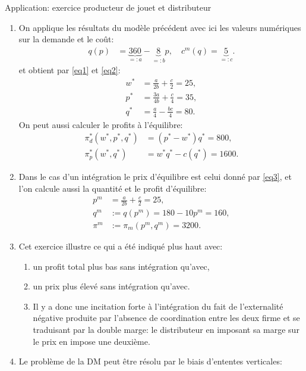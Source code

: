 \begin{frame}[allowframebreaks]{Application: exercice producteur de jouet et distributeur}
\begin{enumerate}
\item On applique les résultats du modèle précédent avec ici les valeurs numériques 
sur la demande et le coût:
\begin{align*}
    q(p) &= \underbrace{360}_{=:a} - \underbrace{8}_{=:b}p, \quad c^m(q) = \underbrace{5}_{=:c}.
\end{align*}
et obtient par \eqref{eq1} et \eqref{eq2}:
\begin{align*}
    w^* &= \frac{a}{2b} + \frac{c}{2} = 25,\\
    p^* &=  \frac{3a}{4b} +\frac{c}{4} = 35,\\
    q^* &= \frac{a}{4} - \frac{bc}{4} = 80.
\end{align*}
On peut aussi calculer le profits à l'équilibre: 
\begin{align*}
\pi_d^*(w^*, p^*, q^*) &= (p^* - w^*) q^* = 800,\\
\pi_p^*(w^*, q^*) &= w^*q^* - c(q^*) = 1600.
\end{align*}
\item Dans le cas d'un intégration le prix d'équilibre est celui donné par \eqref{eq3}, et l'on calcule aussi la 
quantité et le profit d'équilibre:
\begin{align*}
p^m &=  \frac{a}{2b} + \frac{c}{2} = 25,\\
q^m &:=q(p^m) = 180 - 10p^m = 160,\\
\pi^m &:= \pi_m(p^m, q^m)= 3200.
\end{align*}
\item Cet exercice illustre ce qui a été indiqué plus haut avec: 
\begin{enumerate}[$\star$]
\item un profit total plus bas sans intégration qu'avec,
\item un prix plus élevé sans intégration qu'avec.
\item Il y a donc une incitation forte à l'intégration du fait de l'externalité 
négative produite par l'absence de coordination entre les deux firme et se traduisant 
par la double marge: le distributeur en imposant sa marge sur le prix en impose une deuxième. 
\end{enumerate}
\item Le problème de la DM peut être résolu par le biais d'ententes verticales:
\begin{enumerate}[$\star$]

\end{enumerate}
\end{enumerate}
\end{frame}
